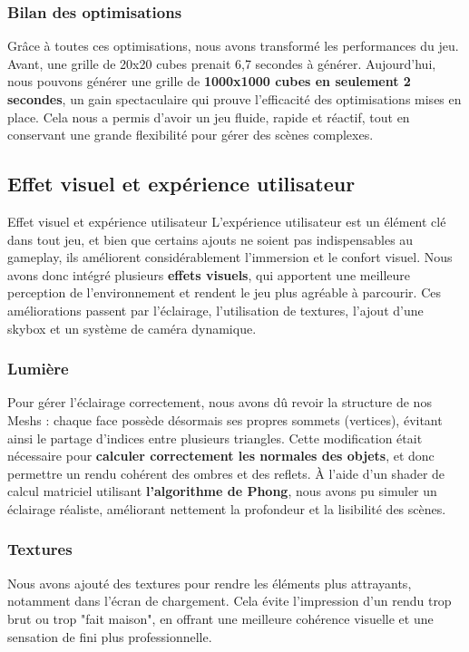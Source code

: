 \subsubsection{Bilan des optimisations}
Grâce à toutes ces optimisations, nous avons transformé les performances du jeu. Avant, une grille de 20x20 cubes prenait 6,7 secondes à générer. Aujourd’hui, nous pouvons générer une grille de \textbf{1000x1000 cubes en seulement 2 secondes}, un gain spectaculaire qui prouve l’efficacité des optimisations mises en place.
Cela nous a permis d’avoir un jeu fluide, rapide et réactif, tout en conservant une grande flexibilité pour gérer des scènes complexes.

\subsection{Effet visuel et expérience utilisateur}
Effet visuel et expérience utilisateur
L’expérience utilisateur est un élément clé dans tout jeu, et bien que certains ajouts ne soient pas indispensables au gameplay, ils améliorent considérablement l’immersion et le confort visuel. Nous avons donc intégré plusieurs \textbf{effets visuels}, qui apportent une meilleure perception de l’environnement et rendent le jeu plus agréable à parcourir. Ces améliorations passent par l’éclairage, l’utilisation de textures, l’ajout d’une skybox et un système de caméra dynamique.
\subsubsection{Lumière}
Pour gérer l’éclairage correctement, nous avons dû revoir la structure de nos Meshs : chaque face possède désormais ses propres sommets (vertices), évitant ainsi le partage d’indices entre plusieurs triangles. Cette modification était nécessaire pour \textbf{calculer correctement les normales des objets}, et donc permettre un rendu cohérent des ombres et des reflets. À l’aide d’un shader de calcul matriciel utilisant \textbf{l’algorithme de Phong}, nous avons pu simuler un éclairage réaliste, améliorant nettement la profondeur et la lisibilité des scènes.
\subsubsection{Textures}
Nous avons ajouté des textures pour rendre les éléments plus attrayants, notamment dans l’écran de chargement. Cela évite l’impression d’un rendu trop brut ou trop "fait maison", en offrant une meilleure cohérence visuelle et une sensation de fini plus professionnelle.
